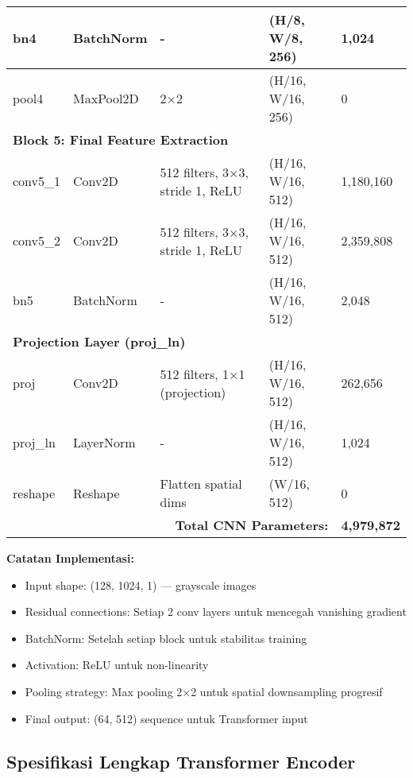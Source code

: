 \documentclass[12pt,a4paper]{article}
\begin{document}
\begin{table}[H]
\begin{tabular}{|l|l|l|l|l|}
bn4 & BatchNorm & - & (H/8, W/8, 256) & 1,024 \\ \hline
pool4 & MaxPool2D & 2×2 & (H/16, W/16, 256) & 0 \\ \hline
\multicolumn{5}{|l|}{\textbf{Block 5: Final Feature Extraction}} \\ \hline
conv5\_1 & Conv2D & 512 filters, 3×3, stride 1, ReLU & (H/16, W/16, 512) & 1,180,160 \\ \hline
conv5\_2 & Conv2D & 512 filters, 3×3, stride 1, ReLU & (H/16, W/16, 512) & 2,359,808 \\ \hline
bn5 & BatchNorm & - & (H/16, W/16, 512) & 2,048 \\ \hline
\multicolumn{5}{|l|}{\textbf{Projection Layer (proj\_ln)}} \\ \hline
proj & Conv2D & 512 filters, 1×1 (projection) & (H/16, W/16, 512) & 262,656 \\ \hline
proj\_ln & LayerNorm & - & (H/16, W/16, 512) & 1,024 \\ \hline
reshape & Reshape & Flatten spatial dims & (W/16, 512) & 0 \\ \hline
\multicolumn{4}{|r|}{\textbf{Total CNN Parameters:}} & \textbf{4,979,872} \\ \hline
\end{tabular}
\end{table}

\textbf{Catatan Implementasi:}
\begin{itemize}
    \item Input shape: (128, 1024, 1) — grayscale images
    \item Residual connections: Setiap 2 conv layers untuk mencegah vanishing gradient
    \item BatchNorm: Setelah setiap block untuk stabilitas training
    \item Activation: ReLU untuk non-linearity
    \item Pooling strategy: Max pooling 2×2 untuk spatial downsampling progresif
    \item Final output: (64, 512) sequence untuk Transformer input
\end{itemize}

\subsection{Spesifikasi Lengkap Transformer Encoder}
\end{document}
